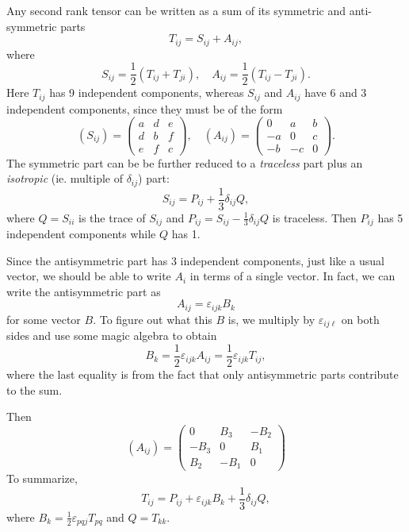 \documentclass[a4paper]{article}
\begin{document}
Any second rank tensor can be written as a sum of its symmetric and anti-symmetric parts
\[
  T_{ij} = S_{ij} + A_{ij},
\]
where
\[
  S_{ij} = \frac{1}{2}(T_{ij} + T_{ji}),\quad A_{ij} = \frac{1}{2}(T_{ij} - T_{ji}).
\]
Here $T_{ij}$ has 9 independent components, whereas $S_{ij}$ and $A_{ij}$ have 6 and 3 independent components, since they must be of the form
\[
  (S_{ij}) = 
  \begin{pmatrix}
    a & d & e\\
    d & b & f\\
    e & f & c
  \end{pmatrix}
  ,\quad
  (A_{ij}) = 
  \begin{pmatrix}
    0 & a & b\\
    -a & 0 & c\\
    -b & -c & 0
  \end{pmatrix}.
\]
The symmetric part can be be further reduced to a \emph{traceless} part plus an \emph{isotropic} (ie. multiple of $\delta_{ij}$) part:
\[
  S_{ij} = P_{ij} + \frac{1}{3}\delta_{ij} Q,
\]
where $Q = S_{ii}$ is the trace of $S_{ij}$ and $P_{ij} = S_{ij} -\frac{1}{3}\delta_{ij}Q$ is traceless. Then $P_{ij}$ has 5 independent components while $Q$ has 1.

Since the antisymmetric part has 3 independent components, just like a usual vector, we should be able to write $A_{i}$ in terms of a single vector. In fact, we can write the antisymmetric part as
\[
  A_{ij} = \varepsilon_{ijk}B_k
\]
for some vector $B$. To figure out what this $B$ is, we multiply by $\varepsilon_{ij\ell}$ on both sides and use some magic algebra to obtain
\[
  B_k = \frac{1}{2}\varepsilon_{ijk}A_{ij} = \frac{1}{2}\varepsilon_{ijk}T_{ij},
\]
where the last equality is from the fact that only antisymmetric parts contribute to the sum.

Then
\[
  (A_{ij}) = 
  \begin{pmatrix}
    0 & B_3 & -B_2\\
    -B_3 & 0 & B_1\\
    B_2 & -B_1 & 0
  \end{pmatrix}
\]
To summarize,
\[
  T_{ij} = P_{ij} + \varepsilon_{ijk}B_k + \frac{1}{3}\delta_{ij}Q,
\]
where $B_k = \frac{1}{2}\varepsilon_{pqj} T_{pq}$ and $Q = T_{kk}$.
\end{document}
